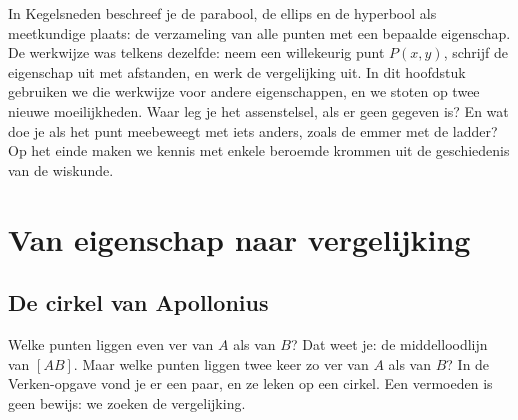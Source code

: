 In Kegelsneden beschreef je de parabool, de ellips en de hyperbool als meetkundige plaats: de verzameling van alle punten met een bepaalde eigenschap. De werkwijze was telkens dezelfde: neem een willekeurig punt $P(x, y)$, schrijf de eigenschap uit met afstanden, en werk de vergelijking uit. In dit hoofdstuk gebruiken we die werkwijze voor andere eigenschappen, en we stoten op twee nieuwe moeilijkheden. Waar leg je het assenstelsel, als er geen gegeven is? En wat doe je als het punt meebeweegt met iets anders, zoals de emmer met de ladder? Op het einde maken we kennis met enkele beroemde krommen uit de geschiedenis van de wiskunde.

\begin{oefeningen}[Start]

\end{oefeningen}


\section{Van eigenschap naar vergelijking}

\subsection{De cirkel van Apollonius}

Welke punten liggen even ver van $A$ als van $B$? Dat weet je: de middelloodlijn van $[AB]$. Maar welke punten liggen twee keer zo ver van $A$ als van $B$? In de Verken-opgave vond je er een paar, en ze leken op een cirkel. Een vermoeden is geen bewijs: we zoeken de vergelijking.

